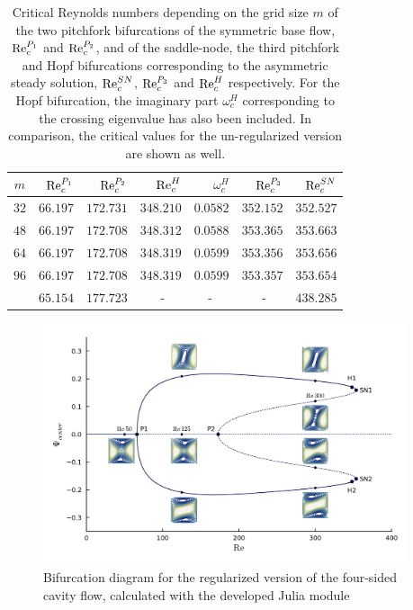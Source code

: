 \begin{table}[h!]
  \centering
  \caption{Critical Reynolds numbers depending on the grid size $m$ of the two
    pitchfork bifurcations of the symmetric base flow, $\mathrm{Re}_c^{P_1}$ and
    $\mathrm{Re}_c^{P_2}$, and of the saddle-node, the third pitchfork and Hopf
    bifurcations corresponding to the asymmetric steady solution,
    $\mathrm{Re}_c^{SN}$, $\mathrm{Re}_c^{P_3}$ and $\mathrm{Re}_c^{H}$ respectively. For the Hopf
    bifurcation, the imaginary part $\omega_c^{H}$ corresponding to the crossing
    eigenvalue has also been included. In comparison, the critical values for the
    un-regularized version are shown as well.}
  \label{tab:re_crit}
\begin{tabular}{crrrrrr}
$m$ & $\mathrm{Re}_c^{P_1}$ & $\mathrm{Re}_c^{P_2}$ & $\mathrm{Re}_c^{H}$ &  $\omega_c^{H}$ & $\mathrm{Re}_c^{P_3}$ & $\mathrm{Re}_c^{SN}$  \\
\hline
$32$ & $66.197$ & $172.731$ & $348.210$ & $0.0582$ & $352.152$ & $352.527$ \\
$48$ & $66.197$ & $172.708$ & $348.312$ & $0.0588$ & $353.365$ & $353.663$ \\
$64$ & $66.197$ & $172.708$ & $348.319$ & $0.0599$ & $353.356$ & $353.656$ \\
$96$ & $66.197$ & $172.708$ & $348.319$ & $0.0599$ & $353.357$ & $353.654$ \\
\citet{chen2013} & $65.154$ & $177.723$ & - $\quad$ & - $\quad$ & - $\quad$ & $438.285$ \\
\end{tabular}
\end{table}

\begin{figure}[h!]
  \centering
  \includegraphics[width=0.95\textwidth]{figs/bifurcation_diag64x64.pdf}
  \caption{Bifurcation diagram for the regularized version of the four-sided
    cavity flow, calculated with the developed Julia module} 
  \label{fig:bif_diag}
\end{figure}

